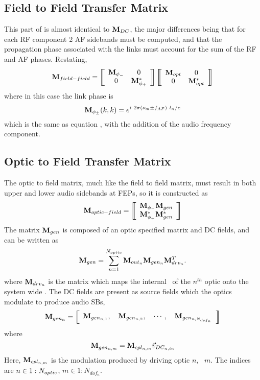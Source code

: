 \documentclass[12pt]{article}
\begin{document}
\subsection{Field to Field Transfer Matrix}
This part of  is almost identical to $\mathbf{M}_{DC}$, the major differences being that for each RF component 2 AF sidebands must be computed, and that the propagation phase associated with the links must account for the sum of the RF and AF phases.
Restating,
\begin{equation}
\matm{field-field} =
\matrixBegin{cc}
 \mPhin{-} & 0 \\
 0 & \mPhin{+}^*\\
\matrixEnd
\matrixBegin{cc}
 \mOpt & 0 \\
 0 & \mOpt^* \\
\matrixEnd
\end{equation}
where in this case the link phase is
\begin{equation}
\mathbf{M}_{\phi_{\pm}}(k,k) = e^{i ~ 2 \pi (\nu_m \pm f_{AF}) ~ l_n / c}
\end{equation}
which is the same as equation , with the addition of the audio frequency component.

\subsection{Optic to Field Transfer Matrix}
The optic to field matrix, much like the field to field matrix, must result in both upper and lower audio sidebands at FEPs, so it is constructed as
\begin{equation}
\matm{optic-field} =
\matrixBegin{c}
 \mPhin{-} \mGen \\
 \mPhin{+}^* \mGen^* \\
\matrixEnd
\elabel{mOF}
\end{equation}
The matrix $\mathbf{M}_{gen}$ is composed of an optic specified matrix and DC fields, and can be written as
\begin{equation}
\mathbf{M}_{gen} = \sum_{n=1}^{N_{optic}} {\mathbf{M}_{out_{n}} \mathbf{M}_{gen_{n}} \mathbf{M}_{drv_{n}}^{T}}.
\end{equation}
where $\mathbf{M}_{drv_{n}}$ is the matrix which maps the internal \dsf\ of the $n^{th}$ optic onto the system wide \dsf. The DC fields are present as source fields which the optics modulate to produce audio SBs,
\begin{equation}
\mGenn{n} = \matrixBegin{c}
\mGenn{n,1} , ~~~ \mGenn{n,2} , ~~~ \cdots , ~~~ \mGenn{n,N_{dof_n}}
\matrixEnd \elabel{mGen}
\end{equation}
where
\begin{equation}
\mathbf{M}_{gen_{n,m}} = \mathbf{M}_{cpl_{n,m}} \vec{v}_{DC_{n,in}}
\end{equation}
Here, $\mathbf{M}_{cpl_{n,m}}$ is the modulation produced by driving optic $n$, \dof\ $m$.
The indices are $n \in 1:N_{optic}$, $m \in 1:N_{dof_n}$.
\end{document}
